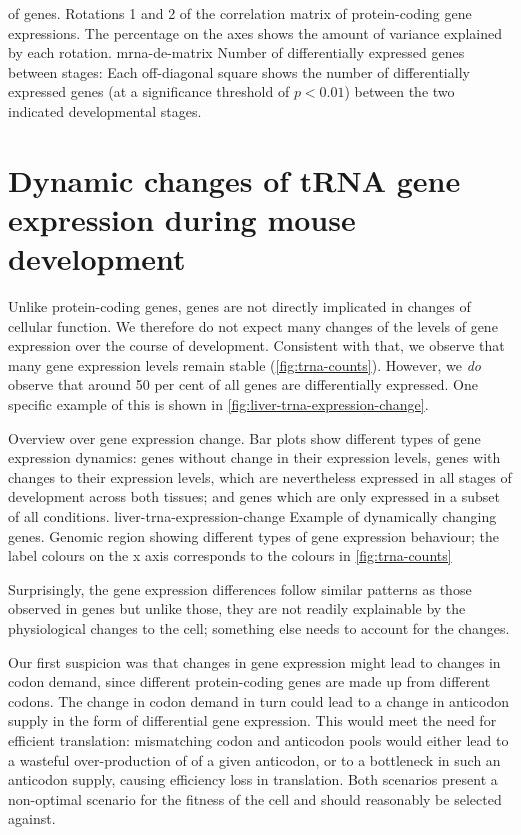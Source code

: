     {\pca of \mrna genes.}
    {Rotations \num{1} and \num{2} of the correlation matrix of
    protein-coding gene expressions. The percentage on the axes shows
    the amount of variance explained by each rotation.}
    {mrna-de-matrix}
    {Number of differentially expressed \mrna genes between stages:}
    {Each off-diagonal square shows the number of differentially
    expressed genes (at a significance threshold of \(p<0.01\)) between
    the two indicated developmental stages.}

\section{Dynamic changes of tRNA gene expression during mouse development}

Unlike protein-coding genes, \trna genes are not directly implicated in changes
of cellular function. We therefore do not expect many changes of the levels of
\trna gene expression over the course of development. Consistent with that, we
observe that many \trna gene expression levels remain stable
(\cref{fig:trna-counts}). However, we \emph{do} observe that around \num{50} per
cent of all \trna genes are differentially expressed. One specific example of
this is shown in \cref{fig:liver-trna-expression-change}.

    {Overview over \trna gene expression change.}
    {Bar plots show different types of \trna gene expression dynamics: \trna
    genes without change in their expression levels, \trna genes with changes to
    their expression levels, which are nevertheless expressed in all stages of
    development across both tissues; and \trna genes which are only expressed in
    a subset of all conditions.}
    {liver-trna-expression-change}
    {Example of dynamically changing \trna genes.}
    {Genomic region showing different types of \trna gene expression behaviour;
    the label colours on the x axis corresponds to the colours in
    \cref{fig:trna-counts}}

Surprisingly, the \trna gene expression differences follow similar patterns as
those observed in \mrna genes  but unlike those, they are not
readily explainable by the physiological changes to the cell; something else
needs to account for the changes.

Our first suspicion was that changes in \mrna gene expression might lead to
changes in codon demand, since different protein-coding genes are made up from
different codons. The change in codon demand in turn could lead to a change in
anticodon supply in the form of differential \trna gene expression. This would
meet the need for efficient translation: mismatching codon and anticodon pools
would either lead to a wasteful over-production of \trna[s] of a given
anticodon, or to a bottleneck in such an anticodon supply, causing efficiency
loss in translation. Both scenarios present a non-optimal scenario for the
fitness of the cell and should reasonably be selected against.

